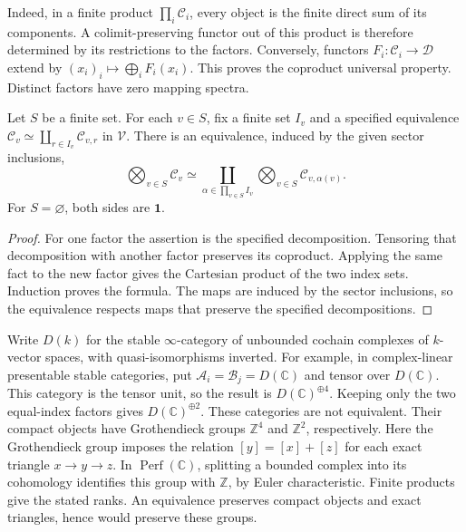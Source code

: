 Indeed, in a finite product $\prod_i\mathcal C_i$, every object is the
finite direct sum of its components. A colimit-preserving functor out of
this product is therefore determined by its restrictions to the factors.
Conversely, functors $F_i:\mathcal C_i\to\mathcal D$ extend by
$(x_i)_i\mapsto\bigoplus_iF_i(x_i)$. This proves the coproduct universal
property. Distinct factors have zero mapping spectra.

\begin{proposition}
\label{v4-arith:eis:finite-sectors}
Let $S$ be a finite set. For each $v\in S$, fix a finite set $I_v$ and a
specified equivalence
$\mathcal C_v\simeq\coprod_{r\in I_v}\mathcal C_{v,r}$ in $\mathcal V$.
There is an equivalence, induced by the given sector inclusions,
\[
 \bigotimes_{v\in S}\mathcal C_v
 \simeq
 \coprod_{\alpha\in\prod_{v\in S}I_v}
       \bigotimes_{v\in S}\mathcal C_{v,\alpha(v)}.
\]
For $S=\varnothing$, both sides are $\mathbf1$.
\end{proposition}

\begin{proof}
For one factor the assertion is the specified decomposition. Tensoring
that decomposition with another factor preserves its coproduct. Applying
the same fact to the new factor gives the Cartesian product of the two
index sets. Induction proves the formula. The maps are induced by the
sector inclusions, so the equivalence respects maps that preserve the
specified decompositions.
\end{proof}

Write $D(k)$ for the stable $\infty$-category of unbounded cochain
complexes of $k$-vector spaces, with quasi-isomorphisms inverted.
For example, in complex-linear presentable stable categories, put
$\mathcal A_i=\mathcal B_j=D(\mathbb C)$ and tensor over $D(\mathbb C)$.
This category is the tensor unit, so the result is $D(\mathbb C)^{\oplus4}$.
Keeping only the two equal-index factors gives $D(\mathbb C)^{\oplus2}$.
These categories are not equivalent. Their compact objects have
Grothendieck groups $\mathbb Z^4$ and $\mathbb Z^2$, respectively.
Here the Grothendieck group imposes the relation $[y]=[x]+[z]$ for each
exact triangle $x\to y\to z$. In $\operatorname{Perf}(\mathbb C)$,
splitting a bounded complex into its cohomology identifies this group
with $\mathbb Z$, by Euler characteristic. Finite products give the
stated ranks. An equivalence preserves compact objects and exact
triangles, hence would preserve these groups.

